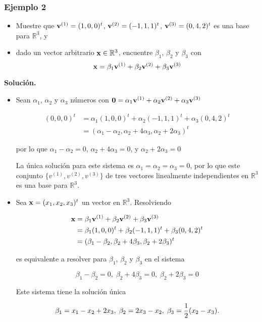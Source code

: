 \documentclass{report}
\numberwithin{subsection}{section} %
\begin{document}
\subsubsection*{Ejemplo 2}
        
\begin{itemize}
    \item Muestre que ${\bf v}^{(1)} = (1,0,0)^t$, ${\bf v}^{(2)} = (-1,1,1)^t$, ${\bf v}^{(3)} = (0,4,2)^t$ es una base para $\mathbb{R}^3$, y
    \item dado un vector arbitrario ${\bf x} \in \mathbb{R}^3$, encuentre $\beta_1$, $\beta_2$ y $\beta_3$ con
    $${\bf x} = \beta_1{\bf v}^{(1)} + \beta_2{\bf v}^{(2)} + \beta_3{\bf v}^{(3)}$$
\end{itemize}

{\bf Solución.}

\begin{itemize}

    \item Sean $\alpha_1$, $\alpha_2$ y $\alpha_3$ números con ${\bf 0} = \alpha_1{\bf v}^{(1)} + \alpha_2{\bf v}^{(2)} + \alpha_3{\bf v}^{(3)}$
    
    \begin{align*}
        (0,0,0)^t & = \alpha_1(1,0,0)^t + \alpha_2(-1,1,1)^t + \alpha_3(0,4,2)^t \\
        & = (\alpha_1 - \alpha_2, \alpha_2 + 4\alpha_3, \alpha_2 + 2\alpha_3)^t
    \end{align*}

    por lo que $\alpha_1 - \alpha_2 = 0$, $\alpha_2 + 4\alpha_3 = 0$, y $\alpha_2 + 2\alpha_3 = 0$

    La única solución para este sistema es $\alpha_1 = \alpha_2 = \alpha_3 = 0$, por lo que este conjunto $\{v^{(1)}, v^{(2)}, v^{(3)}\}$ de tres vectores linealmente independientes en $\mathbb{R}^3$ es una base para $\mathbb{R}^3$.

    \item Sea ${\bf x} = (x_1, x_2, x_3)^t$ un vector en $\mathbb{R}^3$. Resolviendo
    
    \begin{align*}
        {\bf x} & = \beta_1{\bf v}^{(1)} + \beta_2{\bf v}^{(2)} + \beta_3{\bf v}^{(3)} \\
                & = \beta_1(1,0,0)^t + \beta_2(-1,1,1)^t + \beta_3(0,4,2)^t \\
                & = (\beta_1 - \beta_2, \beta_2 + 4\beta_3, \beta_2 + 2\beta_3)^t
    \end{align*}

    es equivalente a resolver para $\beta_1$, $\beta_2$ y $\beta_3$ en el sistema

    $$\beta_1 - \beta_2 = 0, \; \beta_2 + 4\beta_3 = 0, \; \beta_2 + 2\beta_3 = 0$$

    Este sistema tiene la solución única

    $$\beta_1 = x_1 - x_2 + 2x_3, \; \beta_2 = 2x_3 - x_2, \; \beta_3 = {1 \over 2}(x_2 - x_3).$$
    
\end{itemize}
\end{document}
